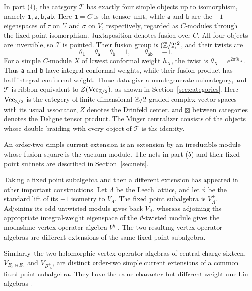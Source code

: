 \documentclass[11pt,reqno]{amsart}
\theoremstyle{definition}\newtheorem{definition}[theorem]{Definition}
\theoremstyle{remark}\newtheorem{remark}[theorem]{Remark}
\newcommand{\one}{\mathbf1}\newcommand{\slc}{\mathfrak{sl}_2}
\newcommand{\Tc}{\mathcal T}\newcommand{\D}{\mathcal D}
\numberwithin{equation}{section}
\begin{document}
\begingroup
In part (4), the category $\Tc$ has exactly four simple objects up to isomorphism, namely $\one,\mathsf a,\mathsf b,\mathsf a\mathsf b$. Here $\one=C$ is the tensor unit, while $\mathsf a$ and $\mathsf b$ are the $-1$ eigenspaces of $\tau$ on $U$ and $\sigma$ on $V$, respectively, regarded as $C$-modules through the fixed point isomorphism. Juxtaposition denotes fusion over $C$. All four objects are invertible, so $\Tc$ is pointed. Their fusion group is $(\mathbb Z/2)^2$, and their twists are
\[
 \theta_{\one}=\theta_{\mathsf a}=\theta_{\mathsf b}=1,
 \qquad \theta_{\mathsf a\mathsf b}=-1.
\]
For a simple $C$-module $X$ of lowest conformal weight $h_X$, the twist is $\theta_X=e^{2\pi i h_X}$. Thus $\mathsf a$ and $\mathsf b$ have integral conformal weights, while their fusion product has half-integral conformal weight. These data give a nondegenerate subcategory, and $\Tc$ is ribbon equivalent to $Z(\mathrm{Vec}_{\mathbb Z/2})$, as shown in Section~\ref{sec:categories}. Here $\mathrm{Vec}_{\mathbb Z/2}$ is the category of finite-dimensional $\mathbb Z/2$-graded complex vector spaces with its usual associator, $Z$ denotes the Drinfeld center, and $\boxtimes$ between categories denotes the Deligne tensor product. The M\"uger centralizer consists of the objects whose double braiding with every object of $\Tc$ is the identity.
\par\endgroup
An order-two simple current extension is an extension by an irreducible module whose fusion square is the vacuum module. The nets in part (5) and their fixed point subnets are described in Section~\ref{sec:nets}.

Taking a fixed point subalgebra and then a different extension has appeared in other important constructions. Let $\Lambda$ be the Leech lattice, and let $\vartheta$ be the standard lift of its $-1$ isometry to $V_\Lambda$. The fixed point subalgebra is $V_\Lambda^+$. Adjoining its odd untwisted module gives back $V_\Lambda$, whereas adjoining the appropriate integral-weight eigenspace of the $\vartheta$-twisted module gives the moonshine vertex operator algebra $V^\natural$ \cite{FLM,HuangMoonshine}. The two resulting vertex operator algebras are different extensions of the same fixed point subalgebra.

Similarly, the two holomorphic vertex operator algebras of central charge sixteen, $V_{E_8\oplus E_8}$ and $V_{D_{16}^+}$, are distinct order-two simple current extensions of a common fixed point subalgebra. They have the same character but different weight-one Lie algebras \cite{DM}.
\end{document}
